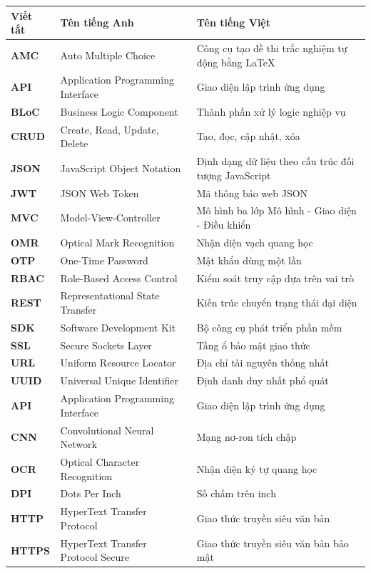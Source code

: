 \documentclass[../DoAn.tex]{subfiles}
\begin{document}
\begin{longtable}{l p{6cm} p{7cm}}
\hline
   \textbf{Viết tắt}  & \textbf{Tên tiếng Anh}	& \textbf{Tên tiếng Việt} \\ \hline 
   \textbf{AMC} & Auto Multiple Choice & Công cụ tạo đề thi trắc nghiệm tự động bằng LaTeX\\
   \textbf{API} & Application Programming Interface & Giao diện lập trình ứng dụng\\
   \textbf{BLoC} & Business Logic Component & Thành phần xử lý logic nghiệp vụ\\
   \textbf{CRUD} & Create, Read, Update, Delete & Tạo, đọc, cập nhật, xóa\\
   \textbf{JSON} & JavaScript Object Notation & Định dạng dữ liệu theo cấu trúc đối tượng JavaScript\\
   \textbf{JWT} & JSON Web Token & Mã thông báo web JSON\\
   \textbf{MVC} & Model-View-Controller & Mô hình ba lớp Mô hình - Giao diện - Điều khiển\\
   \textbf{OMR} & Optical Mark Recognition & Nhận diện vạch quang học\\
   \textbf{OTP} & One-Time Password & Mật khẩu dùng một lần\\
   \textbf{RBAC} & Role-Based Access Control & Kiểm soát truy cập dựa trên vai trò\\
   \textbf{REST} & Representational State Transfer & Kiến trúc chuyển trạng thái đại diện\\
   \textbf{SDK} & Software Development Kit & Bộ công cụ phát triển phần mềm\\
   \textbf{SSL} & Secure Sockets Layer & Tầng ổ bảo mật giao thức\\
   \textbf{URL} & Uniform Resource Locator & Địa chỉ tài nguyên thống nhất\\
   \textbf{UUID} & Universal Unique Identifier & Định danh duy nhất phổ quát\\
   \textbf{API} & Application Programming Interface & Giao diện lập trình ứng dụng\\
   \textbf{CNN} & Convolutional Neural Network & Mạng nơ-ron tích chập\\
   \textbf{OCR} & Optical Character Recognition & Nhận diện ký tự quang học\\
   \textbf{DPI} & Dots Per Inch & Số chấm trên inch\\
   \textbf{HTTP} & HyperText Transfer Protocol & Giao thức truyền siêu văn bản\\
   \textbf{HTTPS} & HyperText Transfer Protocol Secure & Giao thức truyền siêu văn bản bảo mật\\

\end{longtable}
\end{document}
